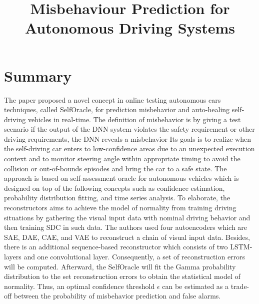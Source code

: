 \documentclass[10pt,a4paper]{report}
\title{Misbehaviour Prediction for Autonomous Driving Systems}
\begin{document}
\begin{center}
\textbf{\thetitle}
\end{center}


\section{Summary}
The paper proposed a novel concept in online testing autonomous cars techniques, called SelfOracle, for prediction misbehavior and auto-healing self-driving vehicles in real-time.
%
The definition of misbehavior is by giving a test scenario if the output of the DNN system violates the safety requirement or other driving requirements, the DNN reveals a misbehavior
%
Its goals is to realize when the self-driving car enters to low-confidence areas due to an unexpected execution context and to monitor steering angle within appropriate timing to avoid the collision or out-of-bounds episodes and bring the car to a safe state.
%
The approach is based on self-assessment oracle for autonomous vehicles which is designed on top of the following concepts such as confidence estimation, probability distribution fitting, and time series analysis.
%
To elaborate, the reconstructors aims to achieve the model of normality from training driving situations by gathering the visual input data with nominal driving behavior and then training SDC in such data. 
%
The authors used four autoencoders which are SAE, DAE, CAE, and VAE to reconstruct a chain of visual input data.
%
Besides, there is an additional sequence-based reconstructor which consists of two LSTM-layers and one convolutional layer.
%
Consequently, a set of reconstruction errors will be computed.
% 
Afterward, the SelfOracle will fit the Gamma probability distribution to the set reconstruction errors to obtain the statistical model of normality. 
%
Thus, an optimal confidence threshold $\epsilon$ can be estimated as a trade-off between the probability of misbehavior prediction and false alarms.
\end{document}
